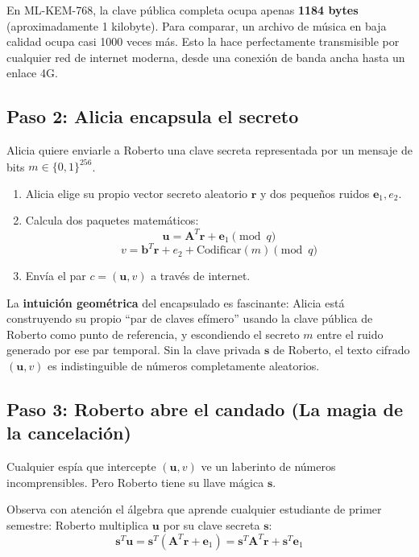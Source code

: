 \begin{ojo}
En ML-KEM-768, la clave pública completa ocupa apenas \textbf{1184 bytes} (aproximadamente 1 kilobyte). Para comparar, un archivo de música en baja calidad ocupa casi 1000 veces más. Esto la hace perfectamente transmisible por cualquier red de internet moderna, desde una conexión de banda ancha hasta un enlace 4G.
\end{ojo}

\subsection*{Paso 2: Alicia encapsula el secreto}
Alicia quiere enviarle a Roberto una clave secreta representada por un mensaje de bits $m \in \{0, 1\}^{256}$.
\begin{enumerate}
  \item Alicia elige su propio vector secreto aleatorio $\mathbf{r}$ y dos pequeños ruidos $\mathbf{e}_1, e_2$.
  \item Calcula dos paquetes matemáticos:
  \[
  \mathbf{u} = \mathbf{A}^T \mathbf{r} + \mathbf{e}_1 \pmod q
  \]
  \[
  v = \mathbf{b}^T \mathbf{r} + e_2 + \text{Codificar}(m) \pmod q
  \]
  \item Envía el par $c = (\mathbf{u}, v)$ a través de internet.
\end{enumerate}

La \textbf{intuición geométrica} del encapsulado es fascinante: Alicia está construyendo su propio ``par de claves efímero'' usando la clave pública de Roberto como punto de referencia, y escondiendo el secreto $m$ entre el ruido generado por ese par temporal. Sin la clave privada $\mathbf{s}$ de Roberto, el texto cifrado $(\mathbf{u}, v)$ es indistinguible de números completamente aleatorios.

\subsection*{Paso 3: Roberto abre el candado (La magia de la cancelación)}
Cualquier espía que intercepte $(\mathbf{u}, v)$ ve un laberinto de números incomprensibles. Pero Roberto tiene su llave mágica $\mathbf{s}$. 

Observa con atención el álgebra que aprende cualquier estudiante de primer semestre: Roberto multiplica $\mathbf{u}$ por su clave secreta $\mathbf{s}$:
\[
\mathbf{s}^T \mathbf{u} = \mathbf{s}^T (\mathbf{A}^T \mathbf{r} + \mathbf{e}_1) = \mathbf{s}^T \mathbf{A}^T \mathbf{r} + \mathbf{s}^T \mathbf{e}_1
\]

